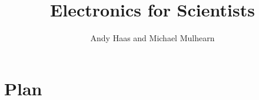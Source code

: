 \documentclass[12pt,oneside]{book}
\begin{document}

\title{Electronics for Scientists}
\author{Andy Haas and Michael Mulhearn}
\maketitle









\appendix



\chapter{Plan}
\end{document}
